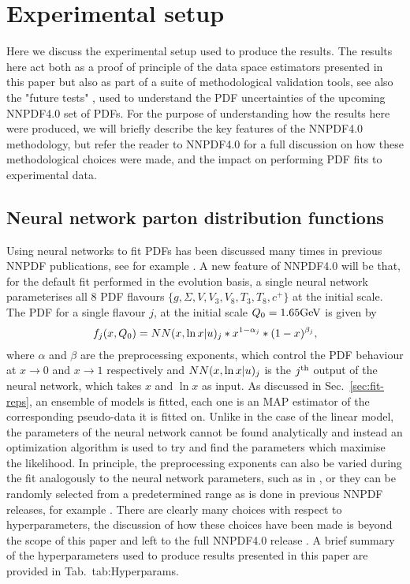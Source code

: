 \section{Experimental setup}

Here we discuss the experimental setup used to produce the results. The
results here act both as a proof of principle of the data space estimators
presented in this paper but also as part of a suite of methodological
validation tools, see also the "future tests" \cite{Cruz_Martinez_2021},
used to
understand the PDF uncertainties of the upcoming NNPDF4.0 set of PDFs.
For the purpose of understanding how the results here were produced, we
will briefly describe the key features of the NNPDF4.0 methodology,
but refer the reader to NNPDF4.0 for a full discussion on how these
methodological choices were made, and the impact on performing PDF fits
to experimental data.

\subsection{Neural network parton distribution functions}

Using neural networks to fit PDFs has been discussed many times in previous
NNPDF publications, see for example \cite{nnpdf30, Ball_2017}. A new
feature of NNPDF4.0 will be that, for the default fit performed in the
evolution basis, a
single neural network parameterises all 8 PDF flavours $\{ g, \Sigma, V, V_3, V_8, T_3, T_8, c^+ \}$
at the initial scale. The PDF for a single flavour $j$, at the initial scale
$Q_0 = 1.65 {\rm GeV}$ is given by
\begin{equation}
    f_j(x, Q_0) = NN(x, \ln x | u)_j * x^{1-\alpha_j} * (1-x)^{\beta_j},
\end{equation}
where $\alpha$ and $\beta$ are the preprocessing exponents, which control the
PDF behaviour at $x \to 0$ and $x \to 1$ respectively and
$NN(x, \ln x | u)_j$ is the
$j^{\rm th}$ output of the neural network, which takes $x$ and $\ln x$ as input.
As discussed in Sec.~\ref{sec:fit-reps}, an ensemble of models is fitted, each
one is an MAP estimator of the corresponding pseudo-data it is fitted on. Unlike
in the case of the linear model, the parameters of the neural network cannot be
found analytically and instead an optimization algorithm is used to try and
find the parameters which maximise the likelihood. In principle, the preprocessing
exponents can also be varied during the fit analogously to the neural network
parameters, such as in \cite{Carrazza_2019}, or they can be randomly selected
from a predetermined range as is done in previous NNPDF releases,
for example \cite{Ball_2017}. There are clearly many choices with respect
to hyperparameters, the discussion of how these choices have been made is
beyond the scope of this paper and left to the full NNPDF4.0 release
\cite{NNPDF40}. A brief summary of the hyperparameters used to produce results
presented in this paper are provided in Tab.~{tab:Hyperparams}.

